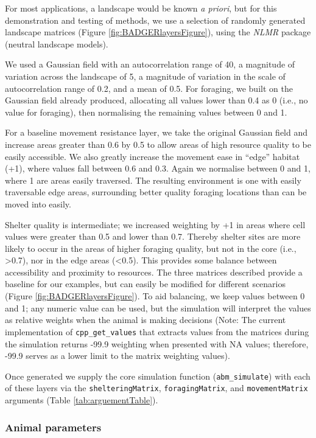 \documentclass[10pt,a4paper]{article}
\begin{document}
For most applications, a landscape would be known \emph{a priori}, but for this demonstration and testing of methods, we use a selection of randomly generated landscape matrices (Figure \ref{fig:BADGERlayersFigure}), using the \emph{NLMR} package (neutral landscape models).

We used a Gaussian field with an autocorrelation range of 40, a magnitude of variation across the landscape of 5, a magnitude of variation in the scale of autocorrelation range of 0.2, and a mean of 0.5.
For foraging, we built on the Gaussian field already produced, allocating all values lower than 0.4 as 0 (i.e., no value for foraging), then normalising the remaining values between 0 and 1.

For a baseline movement resistance layer, we take the original Gaussian field and increase areas greater than 0.6 by 0.5 to allow areas of high resource quality to be easily accessible.
We also greatly increase the movement ease in ``edge'' habitat (+1), where values fall between 0.6 and 0.3.
Again we normalise between 0 and 1, where 1 are areas easily traversed.
The resulting environment is one with easily traversable edge areas, surrounding better quality foraging locations than can be moved into easily.

Shelter quality is intermediate; we increased weighting by +1 in areas where cell values were greater than 0.5 and lower than 0.7.
Thereby shelter sites are more likely to occur in the areas of higher foraging quality, but not in the core (i.e., \textgreater0.7), nor in the edge areas (\textless0.5).
This provides some balance between accessibility and proximity to resources.
The three matrices described provide a baseline for our examples, but can easily be modified for different scenarios (Figure \ref{fig:BADGERlayersFigure}).
To aid balancing, we keep values between 0 and 1; any numeric value can be used, but the simulation will interpret the values as relative weights when the animal is making decisions (Note: The current implementation of \texttt{cpp\_get\_values} that extracts values from the matrices during the simulation returns -99.9 weighting when presented with NA values; therefore, -99.9 serves as a lower limit to the matrix weighting values).

Once generated we supply the core simulation function (\texttt{abm\_simulate}) with each of these layers via the \texttt{shelteringMatrix}, \texttt{foragingMatrix}, and \texttt{movementMatrix} arguments (Table \ref{tab:arguementTable}).

\subsubsection{Animal parameters}\label{animal-parameters}
\end{document}
